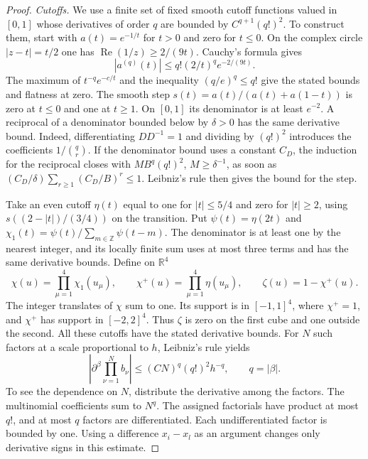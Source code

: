 \documentclass[11pt,letterpaper,reqno]{amsart}
\numberwithin{equation}{section}
\theoremstyle{definition}
\theoremstyle{remark}
\begin{document}
\begin{proof}
\emph{Cutoffs.}
We use a finite set of fixed smooth cutoff functions valued in
\([0,1]\) whose derivatives of order \(q\) are bounded by
\(C^{q+1}(q!)^2\). To construct them, start with
\(a(t)=e^{-1/t}\) for \(t>0\) and zero for \(t\le0\).
On the complex circle \(|z-t|=t/2\) one has
\(\operatorname{Re}(1/z)\ge2/(9t)\). Cauchy's formula gives
\[
 |a^{(q)}(t)|\le q!(2/t)^q e^{-2/(9t)}.
\]
The maximum of \(t^{-q}e^{-c/t}\) and the inequality
\((q/e)^q\le q!\) give the stated bounds and flatness at zero.
The smooth step \(s(t)=a(t)/(a(t)+a(1-t))\) is zero at \(t\le0\)
and one at \(t\ge1\). On \([0,1]\) its denominator is at least
\(e^{-2}\). A reciprocal of a denominator bounded below by
\(\delta>0\) has the same derivative bound. Indeed, differentiating
\(D D^{-1}=1\) and dividing by \((q!)^2\) introduces the
coefficients \(1/\binom qr\). If the denominator bound uses a
constant \(C_D\), the induction for the reciprocal closes with
\(M B^q(q!)^2\), \(M\ge\delta^{-1}\), as soon as
\((C_D/\delta)\sum_{r\ge1}(C_D/B)^r\le1\).
Leibniz's rule then gives the bound for the step.

Take an even cutoff \(\eta(t)\) equal to one for \(|t|\le5/4\)
and zero for \(|t|\ge2\), using \(s((2-|t|)/(3/4))\) on the
transition.
Put \(\psi(t)=\eta(2t)\) and
\(\chi_1(t)=\psi(t)/\sum_{m\in\mathbb Z}\psi(t-m)\).
The denominator is at least one by the nearest integer, and its
locally finite sum uses at most three terms and has the same
derivative bounds. Define on \(\mathbb R^4\)
\[
 \chi(u)=\prod_{\mu=1}^4\chi_1(u_\mu),\qquad
 \chi^+(u)=\prod_{\mu=1}^4\eta(u_\mu),\qquad
 \zeta(u)=1-\chi^+(u).
\]
The integer translates of \(\chi\) sum to one.
Its support is in \([-1,1]^4\), where \(\chi^+=1\), and
\(\chi^+\) has support in \([-2,2]^4\). Thus \(\zeta\) is zero
on the first cube and one outside the second. All these
cutoffs have the stated derivative bounds. For \(N\) such
factors at a scale proportional to \(h\), Leibniz's rule yields
\begin{equation}\label{cl:eq-cutoff-product}
 \left|\partial^\beta \prod_{\nu=1}^N b_\nu\right|
 \le (CN)^q(q!)^2h^{-q},\qquad q=|\beta|.
\end{equation}
To see the dependence on \(N\), distribute the derivative
among the factors. The multinomial coefficients sum to \(N^q\).
The assigned factorials have product at most \(q!\), and
at most \(q\) factors are differentiated. Each undifferentiated
factor is bounded by one. Using a difference \(x_i-x_l\)
as an argument changes only derivative signs in this estimate.


\end{proof}
\end{document}
